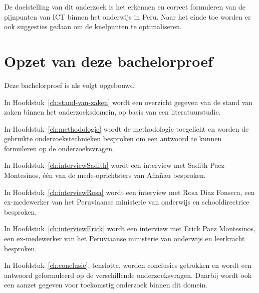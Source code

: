 
De doelstelling van dit onderzoek is het erkennen en correct formuleren van de pijnpunten van ICT binnen het onderwijs in Peru. Naar het einde toe worden er ook suggesties gedaan om de knelpunten te optimaliseren.

\section{Opzet van deze bachelorproef}
\label{sec:opzet-bachelorproef}


Deze bachelorproef is als volgt opgebouwd:

In Hoofdstuk~\ref{ch:stand-van-zaken} wordt een overzicht gegeven van de stand van zaken binnen het onderzoeksdomein, op basis van een literatuurstudie.

In Hoofdstuk~\ref{ch:methodologie} wordt de methodologie toegelicht en worden de gebruikte onderzoekstechnieken besproken om een antwoord te kunnen formuleren op de onderzoeksvragen.

In Hoofdstuk~\ref{ch:interviewSadith} wordt een interview met Sadith Paez Montesinos, één van de mede-oprichtsters van Añañau besproken.

In Hoofdstuk~\ref{ch:interviewRosa} wordt een interview met Rosa Diaz Fonseca, een ex-medewerker van het Peruviaanse ministerie van onderwijs en schooldirectrice besproken.

In Hoofdstuk~\ref{ch:interviewErick} wordt een interview met Erick Paez Montesinos, een ex-medewerker van het Peruviaanse ministerie van onderwijs en leerkracht besproken.

In Hoofdstuk~\ref{ch:conclusie}, tenslotte, worden conclusies getrokken en wordt een antwoord geformuleerd op de verschillende onderzoeksvragen. Daarbij wordt ook een aanzet gegeven voor toekomstig onderzoek binnen dit domein.
